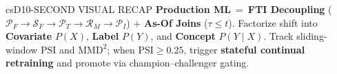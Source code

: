 \documentclass[../../../../master.tex]{subfiles}
\begin{document}
\begin{cscolumns}
\begin{cscard}{csD}{10-SECOND VISUAL RECAP}
  \sffamily\footnotesize
  \textbf{Production ML} \,=\, \textbf{FTI Decoupling} ($\mathcal{P}_F\!\to\!\mathcal{S}_F\!\to\!\mathcal{P}_T\!\to\!\mathcal{R}_M\!\to\!\mathcal{P}_I$) $+$ \textbf{As-Of Joins} ($\tau\le t$).
  Factorize shift into \textbf{Covariate} $P(X)$, \textbf{Label} $P(Y)$, and \textbf{Concept} $P(Y\mid X)$.
  Track sliding-window $\mathrm{PSI}$ and $\mathrm{MMD}^2$; when $\mathrm{PSI}\ge 0.25$, trigger \textbf{stateful continual retraining} and promote via champion--challenger gating.
\end{cscard}
\end{cscolumns}

\csend
\end{document}
